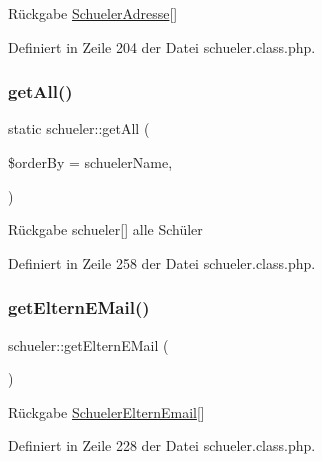 \begin{DoxyReturn}{Rückgabe}
\mbox{\hyperlink{class_schueler_adresse}{Schueler\+Adresse}}\mbox{[}\mbox{]} 
\end{DoxyReturn}


Definiert in Zeile 204 der Datei schueler.\+class.\+php.

\mbox{\label{classschueler_a950f5d55b69ceb06cf4c73a00b986a6d}} 
\subsubsection{\texorpdfstring{get\+All()}{getAll()}}
{\footnotesize\ttfamily static schueler\+::get\+All (\begin{DoxyParamCaption}\item[{}]{\$order\+By = {\ttfamily \textquotesingle{}schuelerName},  }\item[{schueler\+Rufname\textquotesingle{}}]{ }\end{DoxyParamCaption})\hspace{0.3cm}{\ttfamily [static]}}

\begin{DoxyReturn}{Rückgabe}
schueler\mbox{[}\mbox{]} alle Schüler 
\end{DoxyReturn}


Definiert in Zeile 258 der Datei schueler.\+class.\+php.

\mbox{\label{classschueler_a5b6d9b634ce27e6a1de6bad504c2a6ff}} 
\subsubsection{\texorpdfstring{get\+Eltern\+E\+Mail()}{getElternEMail()}}
{\footnotesize\ttfamily schueler\+::get\+Eltern\+E\+Mail (\begin{DoxyParamCaption}{ }\end{DoxyParamCaption})}

\begin{DoxyReturn}{Rückgabe}
\mbox{\hyperlink{class_schueler_eltern_email}{Schueler\+Eltern\+Email}}\mbox{[}\mbox{]} 
\end{DoxyReturn}


Definiert in Zeile 228 der Datei schueler.\+class.\+php.

